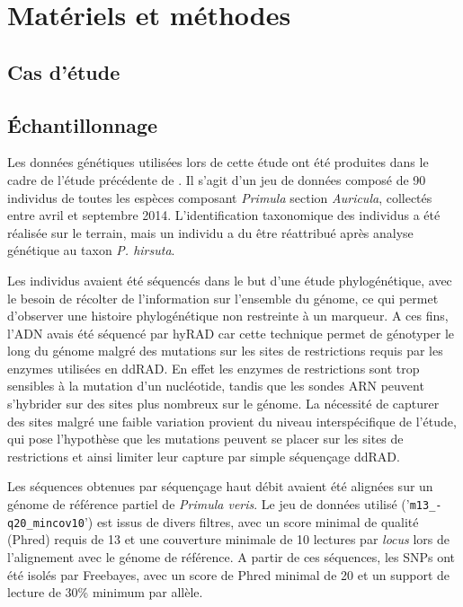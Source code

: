 
\section{Matériels et méthodes}

\subsection{Cas d'étude}



\subsection{Échantillonnage}

Les données génétiques utilisées lors de cette étude ont été produites dans le cadre de l'étude précédente de \citet{Boucher2016a}. Il s'agit d'un jeu de données composé de 90 individus de toutes les espèces composant \textit{Primula} section \textit{Auricula}, collectés entre avril et septembre 2014. L'identification taxonomique des individus a été réalisée sur le terrain, mais un individu a du être réattribué après analyse génétique au taxon \textit{P. hirsuta}.

Les individus avaient été séquencés dans le but d'une étude phylogénétique, avec le besoin de récolter de l'information sur l'ensemble du génome, ce qui permet d'observer une histoire phylogénétique non restreinte à un marqueur. A ces fins, l'ADN avais été séquencé par hyRAD \citep{Suchan2016} car cette technique permet de génotyper le long du génome malgré des mutations sur les sites de restrictions requis par les enzymes utilisées en ddRAD. En effet les enzymes de restrictions sont trop sensibles à la mutation d'un nucléotide, tandis que les sondes ARN peuvent s'hybrider sur des sites plus nombreux sur le génome. La nécessité de capturer des sites malgré une faible variation provient du niveau interspécifique de l'étude, qui pose l'hypothèse que les mutations peuvent se placer sur les sites de restrictions et ainsi limiter leur capture par simple séquençage ddRAD. 

Les séquences obtenues par séquençage haut débit avaient été alignées sur un génome de référence partiel de \textit{Primula veris}. Le jeu de données utilisé ('\verb|m13_-q20_mincov10|') est issus de divers filtres, avec un score minimal de qualité (Phred) requis de 13 et une couverture minimale de 10 lectures par \textit{locus} lors de l'alignement avec le génome de référence. A partir de ces séquences, les SNPs ont été isolés par Freebayes, avec un score de Phred minimal de 20 et un support de lecture de 30\% minimum par allèle.

